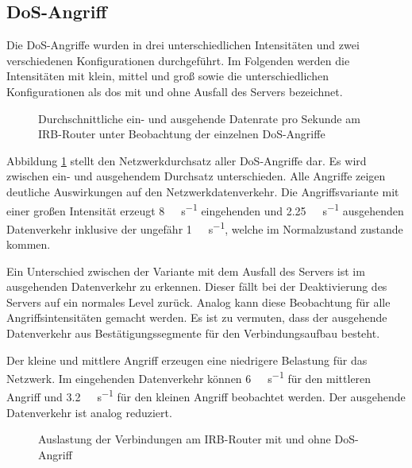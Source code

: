 \subsection{DoS-Angriff}\label{sec:dos}
Die DoS-Angriffe wurden in drei unterschiedlichen Intensitäten und zwei verschiedenen Konfigurationen durchgeführt. Im Folgenden werden die Intensitäten mit klein, mittel und groß sowie die unterschiedlichen Konfigurationen als \gls{dos} mit und ohne Ausfall des Servers bezeichnet.

\begin{figure}[ht]
	\centering
	
	\caption[Durchschnittliche Datenrate pro Sekunde am IRB-Router]{Durchschnittliche ein- und ausgehende Datenrate pro Sekunde am IRB-Router unter Beobachtung der einzelnen DoS-Angriffe}
	\label{fig:internetRouterThruput}
\end{figure}

Abbildung \ref{fig:internetRouterThruput} stellt den Netzwerkdurchsatz aller DoS-Angriffe dar. Es wird zwischen ein- und ausgehendem Durchsatz unterschieden. Alle Angriffe zeigen deutliche Auswirkungen auf den Netzwerkdatenverkehr. Die Angriffsvariante mit einer großen Intensität erzeugt  \SI{8}{\giga\bit\per\second} eingehenden und  \SI{2.25}{\giga\bit\per\second} ausgehenden Datenverkehr inklusive der ungefähr \SI{1}{\giga\bit\per\second}, welche im Normalzustand zustande kommen.

Ein Unterschied zwischen der Variante mit dem Ausfall des Servers ist im ausgehenden Datenverkehr zu erkennen. Dieser fällt bei der Deaktivierung des Servers auf ein normales Level zurück. Analog kann diese Beobachtung für alle Angriffsintensitäten gemacht werden. Es ist zu vermuten, dass der ausgehende Datenverkehr aus Bestätigungssegmente für den Verbindungsaufbau besteht.

Der kleine und mittlere Angriff erzeugen eine niedrigere Belastung für das Netzwerk. Im eingehenden Datenverkehr können \SI{6}{\giga\bit\per\second} für den mittleren Angriff und  \SI{3.2}{\giga\bit\per\second} für den kleinen Angriff beobachtet werden. Der ausgehende Datenverkehr ist analog reduziert. 

\begin{figure}[ht]
	\centering
	
	\caption[IRB-Router Verbindungsauslastung]{Auslastung der Verbindungen am IRB-Router mit und ohne DoS-Angriff} 
	\label{fig:utilRouterWichtige}
\end{figure}

